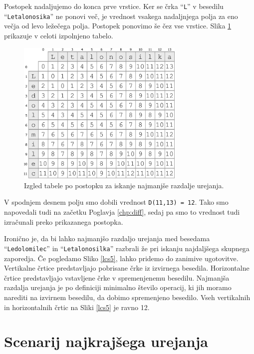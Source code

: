 \documentclass[a4paper, 12pt, twoside]{book}
\begin{document}
Postopek nadaljujemo do konca prve vrstice. Ker se črka “{\tt L}” v besedilu “{\tt Letalonosika}” ne ponovi več, je vrednost vsakega nadaljnjega polja za eno večja od levo ležečega polja. Postopek ponovimo še čez vse vrstice. Slika \ref{med4} prikazuje v celoti izpolnjeno tabelo.

\begin{figure}[placement h]
\begin{center}
\includegraphics[width=8cm]{img/med4.pdf}
\end{center}
\caption{Izgled tabele po postopku za iskanje najmanjše razdalje urejanja.}
\label{med4}
\end{figure}

V spodnjem desnem polju smo dobili vrednost {\tt D(11,13) = 12}. Tako smo napovedali tudi na začetku Poglavja \ref{chp:diff}, sedaj pa smo to vrednost tudi izračunali preko prikazanega postopka.

Ironično je, da bi lahko najmanjšo razdaljo urejanja med besedama “{\tt Ledolomilec}” in “{\tt Letalonosilka}” razbrali že pri iskanju najdaljšega skupnega zaporedja. Če pogledamo Sliko \ref{lcs5}, lahko pridemo do zanimive ugotovitve. Vertikalne črtice predstavljajo pobrisane črke iz izvirnega besedila. Horizontalne črtice predstavljajo vstavljene črke v spremenjenemu besedilu. Najmanjša razdalja urejanja je po definiciji minimalno število operacij, ki jih moramo narediti na izvirnem besedilu, da dobimo spremenjeno besedilo. Vseh vertikalnih in horizontalnih črtic na Sliki \ref{lcs5} je ravno 12.

\section{Scenarij najkrajšega urejanja}
\label{sec:ses}
\end{document}
